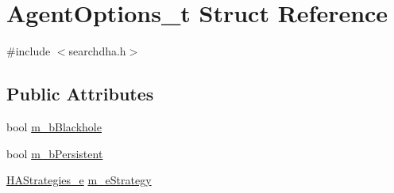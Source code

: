 \hypertarget{structAgentOptions__t}{\section{Agent\-Options\-\_\-t Struct Reference}
\label{structAgentOptions__t}
}


{\ttfamily \#include $<$searchdha.\-h$>$}

\subsection*{Public Attributes}
\begin{DoxyCompactItemize}
\item 
bool \hyperlink{structAgentOptions__t_a6be89adf43347bcac511cae0f075e9e9}{m\-\_\-b\-Blackhole}
\item 
bool \hyperlink{structAgentOptions__t_a3a115763a6e676c7d7b15614a047e797}{m\-\_\-b\-Persistent}
\item 
\hyperlink{searchdha_8h_a1b0cbd6f2db32182ca11738e289d0152}{H\-A\-Strategies\-\_\-e} \hyperlink{structAgentOptions__t_ae5e3591a481f7a2a3772ac41d451fc00}{m\-\_\-e\-Strategy}
\end{DoxyCompactItemize}


